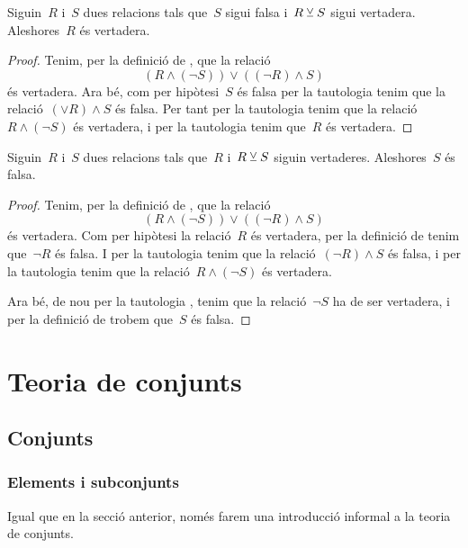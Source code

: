 \documentclass[../../main.tex]{subfiles}
\begin{document}
    \begin{tautology}
        \label{taut:disjuncio-excloent-1}
        Siguin~\(R\) i~\(S\) dues relacions tals que~\(S\) sigui falsa i~\(R\mathbin{\veebar} S\) sigui vertadera.
        Aleshores~\(R\) és vertadera.
    \end{tautology}
    \begin{proof}
        Tenim, per la definició de , que la relació
        \[
            (R\land(\lnot S))\lor((\lnot R)\land S)
        \]
        és vertadera.
        Ara bé, com per hipòtesi~\(S\) és falsa per la tautologia  tenim que la relació~\((\lor R)\land S\) és falsa.
        Per tant per la tautologia  tenim que la relació~\(R\land(\lnot S)\) és vertadera, i per la tautologia  tenim que~\(R\) és vertadera.
    \end{proof}
    \begin{tautology}
        \label{taut:disjuncio-excloent-2}
        Siguin~\(R\) i~\(S\) dues relacions tals que~\(R\) i~\(R\mathbin{\veebar} S\) siguin vertaderes.
        Aleshores~\(S\) és falsa.
    \end{tautology}
    \begin{proof}
        Tenim, per la definició de , que la relació
        \[
            (R\land(\lnot S))\lor((\lnot R)\land S)
        \]
        és vertadera.
        Com per hipòtesi la relació~\(R\) és vertadera, per la definició de  tenim que~\(\lnot R\) és falsa.
        I per la tautologia  tenim que la relació~\((\lnot R)\land S\) és falsa, i per la tautologia  tenim que la relació~\(R\land(\lnot S)\) és vertadera.

        Ara bé, de nou per la tautologia , tenim que la relació~\(\lnot S\) ha de ser vertadera, i per la definició de  trobem que~\(S\) és falsa.
    \end{proof}
\chapter{Teoria de conjunts}
\section{Conjunts}
    \subsection{Elements i subconjunts}
    Igual que en la secció anterior, només farem una introducció informal a la teoria de conjunts.
\end{document}
